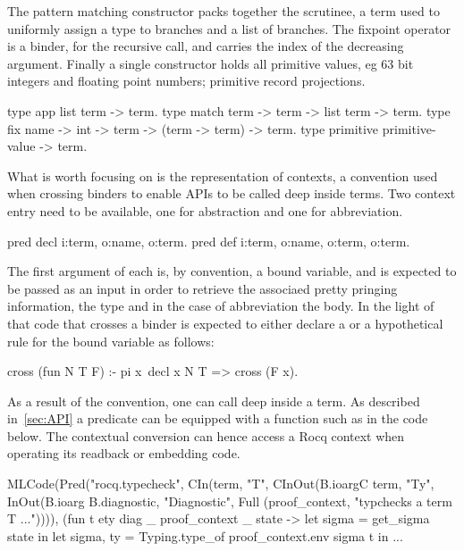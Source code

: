 \documentclass[a4paper, 11pt]{book}
\begin{document}
The pattern matching constructor packs together the scrutinee,
a term used to uniformly assign a type to branches and a list of
branches. The fixpoint operator is a binder, for the recursive call,
and carries the index of the decreasing argument. Finally a single
constructor holds all primitive values, eg 63 bit integers and floating
point numbers; primitive record projections.

\begin{elpicode}
type app       list term -> term.                     
type match     term -> term -> list term -> term.   
type fix       name -> int -> term -> (term -> term) -> term.
type primitive primitive-value -> term.
\end{elpicode}

What is worth focusing on is the representation of contexts, a convention
used when crossing binders to enable APIs to be called deep inside terms.
Two context entry need to be available, one for abstraction and one for
abbreviation.

\begin{elpicode}
pred decl i:term, o:name, o:term.                 %
pred def  i:term, o:name, o:term, o:term.         %
\end{elpicode}

The first argument of each is, by convention, a bound variable, and is
expected to be passed as an input in order to retrieve the associaed
pretty pringing information, the type and in the case of
abbreviation the body. In the light of that code that crosses a binder
is expected to either declare a  or a 
hypothetical rule for the bound variable as follows:

\begin{elpicode}
cross (fun N T F) :- pi x\ decl x N T => cross (F x).
\end{elpicode}

As a result of the convention, one can call 
deep inside a term. As described in~\ref{sec:API} a predicate can
be equipped with a  function such
as  in the code below. The 
contextual conversion can hence access a Rocq context when operating its
readback or embedding code.

\begin{ocamlcode}
MLCode(Pred("rocq.typecheck",
  CIn(term, "T",
  CInOut(B.ioargC term, "Ty",
  InOut(B.ioarg B.diagnostic, "Diagnostic",
  Full (proof_context, "typchecks a term T ...")))),
    (fun t ety diag _ proof_context _ state ->
      let sigma = get_sigma state in
      let sigma, ty = Typing.type_of proof_context.env sigma t in
      ...
\end{ocamlcode}
\end{document}
